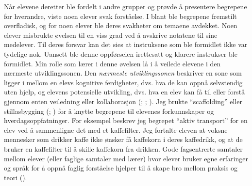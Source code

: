 \documentclass[main.tex]{subfiles}
\begin{document}
\newline
\newline
Når elevene deretter ble fordelt i andre grupper og prøvde å presentere begrepene for hverandre, 
viste noen elever svak forståelse. I blant ble begrepene fremstilt overfladisk, og for noen elever 
ble deres svakheter om temaene avdekket. Noen elever misbrukte øvelsen til en viss grad ved å 
avskrive notatene til sine medelever. Til deres forsvar kan det sies at instruksene som ble formidlet 
ikke var tydelige nok. Uansett ble denne oppførselen irettesatt og klarere instrukser ble formidlet.
\newline
\newline
Min rolle som lærer i denne øvelsen lå i å veilede elevene i den nærmeste utviklingssonen.
Den \emph{nærmeste utviklingssonen} beskriver en sone som ligger i mellom en elevs kognitive 
ferdigheter, dvs. hva de kan oppnå selvstendig uten hjelp, og elevens potensielle utvikling, dvs. 
hva en elev kan få til eller forstå gjennom enten veiledning eller kollaborasjon 
(; ; ). Jeg brukte ``scaffolding'' 
eller stillasbygging (; ) for å knytte begrepene til elevenes 
forkunnskaper og hverdagsoppfatninger. For eksempel beskrev jeg begrepet ``aktiv transport'' for
en elev ved å sammenligne det med et kaffefilter. Jeg fortalte eleven at voksne mennesker som 
drikker kaffe ikke ønsker få kaffekorn i deres kaffedrikk, og at de bruker en kaffefilter til å
skille kaffekorn fra drikken. Gode fagsentrerte samtaler mellom elever (eller faglige samtaler 
med lærer) hvor elever bruker egne erfaringer og språk for å oppnå faglig forståelse hjelper 
til å skape bro mellom praksis og teori ().
\end{document}
